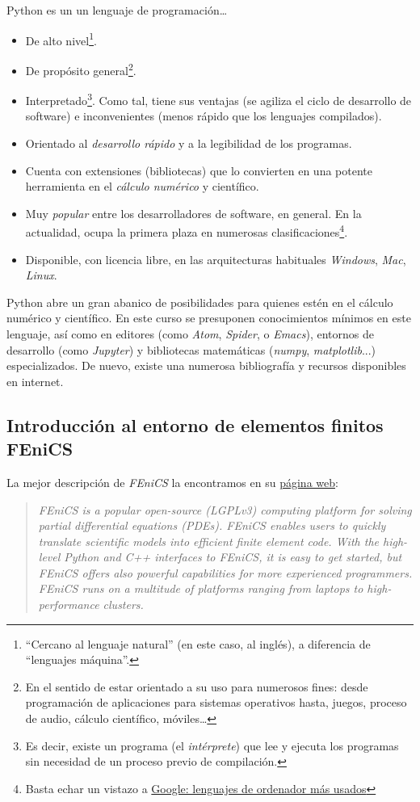 Python es un un lenguaje de programación\ldots{}
\begin{itemize}
\item De alto nivel\footnote{``Cercano al lenguaje
    natural'' (en este caso, al inglés), a diferencia de
    ``lenguajes máquina''.}.
\item De propósito general\footnote{En el sentido de estar orientado a
    su uso para numerosos fines: desde programación de aplicaciones para
    sistemas operativos hasta, juegos, proceso de audio, cálculo
    científico, móviles\ldots{}}.
\item Interpretado\footnote{Es decir, existe un programa (el
    \emph{intérprete}) que lee y ejecuta los programas sin necesidad
    de un proceso previo de compilación.}. Como tal, tiene sus ventajas
  (se agiliza el ciclo de desarrollo de software) e inconvenientes
  (menos rápido que los lenguajes compilados).
\item Orientado al \emph{desarrollo rápido} y a la legibilidad de los programas.
\item Cuenta con extensiones (bibliotecas) que lo convierten en una
      potente herramienta en el \emph{cálculo numérico} y científico.
    \item Muy \emph{popular} entre los desarrolladores de software, en
      general. En la actualidad, ocupa la primera plaza en numerosas
      clasificaciones\footnote{Basta echar un vistazo a \href{https://www.google.com/search?channel=fs&client=ubuntu&q=lenguajes+de+ordenador+m\%C3\%A1s+usados}{Google: lenguajes de ordenador más usados}}.
    \item Disponible, con licencia libre, en las arquitecturas habituales \emph{Windows},
  \emph{Mac}, \emph{Linux}.
\end{itemize}

Python abre un gran abanico de posibilidades para quienes estén
en el cálculo numérico y científico. En este
curso se presuponen conocimientos mínimos en este lenguaje, así como
en editores (como \textit{Atom}, \textit{Spider}, o \textit{Emacs}),
entornos de desarrollo (como \textit{Jupyter}) y bibliotecas
matemáticas (\textit{numpy}, \textit{matplotlib}...)
especializados. De nuevo, existe una numerosa bibliografía y recursos
disponibles en internet.


\subsection{Introducción al entorno de elementos finitos FEniCS}
\label{sec:FEniCS}
La mejor descripción de \textit{FEniCS} la encontramos en su \href{https://fenicsproject.org/}{página web}:
\begin{quote}
  \it FEniCS is a popular open-source (LGPLv3) computing platform for solving partial differential equations (PDEs). FEniCS enables users to quickly translate scientific models into efficient finite element code. With the high-level Python and C++ interfaces to FEniCS, it is easy to get started, but FEniCS offers also powerful capabilities for more experienced programmers. FEniCS runs on a multitude of platforms ranging from laptops to high-performance clusters.
\end{quote}

